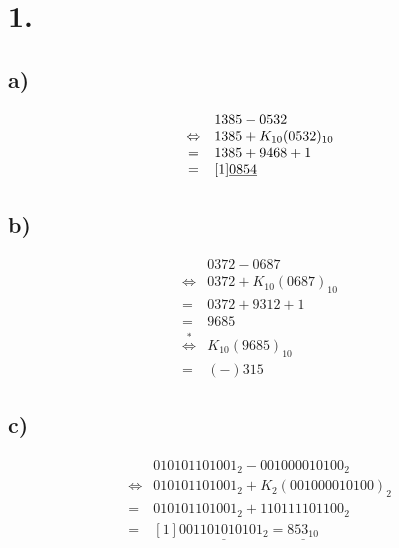 \documentclass[a4paper]{scrartcl}
\title{\titleinfo}
\author{Tronje Krabbe 6435002, The-Vinh Jackie Huynh 6388888,\\Arne Struck 6326505}
\date{\today}
\begin{document}
\maketitle
\notag
\section{1.}
	\subsection{a)}
		\[
		\begin{array}{cl}
			&1385-0532 \\
			\Leftrightarrow &1385+K_ {10}(0532)_{10} \\
			=&1385+9468+1 \\ 
			=&[1]\underline{0854} \\
		\end{array}\\
		\]
		

	\subsection{b)}
		\[
		\begin{array}{cl}
			&0372-0687 \\
			\Leftrightarrow & 0372 + K_{10}(0687)_{10} \\
			=&0372+9312+1 \\
			=&9685 \\
			\overset{*}{\Leftrightarrow} & K_{10}(9685)_{10} \\
			=& (-)315
		\end{array}
		\]


	\subsection{c)}
	\[
	\begin{array}{cl}
		 &010101101001_2-001000010100_2 \\
		 \Leftrightarrow & 010101101001_2 + K_2(001000010100)_2 \\
		=&010101101001_2+110111101100_2 \\
		=&[1]\underline{001101010101_2} = \underline{853_{10}}\\
	\end{array}
	\]

	
\end{document}
